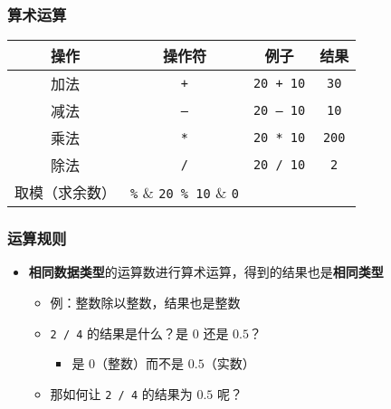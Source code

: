 \begin{frame}[fragile]
    \frametitle{算术运算}

    \begin{table}[]
        \begin{tabular}{cccc}
            \toprule
            操作          & 操作符        & 例子                & 结果            \\
            \midrule
            加法          & \lstinline|+| & \lstinline|20 + 10| & \lstinline|30|  \\
            减法          & \lstinline|–| & \lstinline|20 – 10| & \lstinline|10|  \\
            乘法          & \lstinline|*| & \lstinline|20 * 10| & \lstinline|200| \\
            除法          & \lstinline|/| & \lstinline|20 / 10| & \lstinline|2|   \\
            取模（求余数）& \lstinline|%| & \lstinline|20 % 10| & \lstinline|0|   \\
            \bottomrule
        \end{tabular}
    \end{table}
\end{frame}

\begin{frame}[fragile]
    \frametitle{运算规则}

    \begin{itemize}[<+->]
        \item \textbf{相同数据类型}的运算数进行算术运算，得到的结果也是\textbf{相同类型}

            \begin{itemize}
                \item 例：整数除以整数，结果也是整数
                \item \lstinline|2 / 4| 的结果是什么？是 $0$ 还是 $0.5$？

                    \begin{itemize}
                        \item 是 $0$（整数）而不是 $0.5$（实数）
                    \end{itemize}

                \item 那如何让 \lstinline|2 / 4| 的结果为 $0.5$ 呢？
            \end{itemize}

    \end{itemize}
\end{frame}

